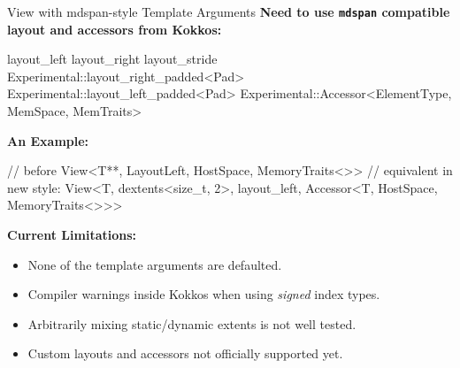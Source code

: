 \begin{frame}[fragile]{View with mdspan-style Template Arguments}
\textbf{Need to use \texttt{mdspan} compatible layout and accessors from Kokkos:}
\begin{code}[keywords={layout_left, layout_right, layout_stride, layout_left_padded, layout_right_padded, Accessor}]
   layout_left layout_right layout_stride
   Experimental::layout_right_padded<Pad> Experimental::layout_left_padded<Pad>
   Experimental::Accessor<ElementType, MemSpace, MemTraits>
\end{code}

\textbf{An Example:}
\begin{code}
  // before
  View<T**, LayoutLeft, HostSpace, MemoryTraits<>>
  // equivalent in new style:
  View<T, dextents<size_t, 2>, layout_left, Accessor<T, HostSpace, MemoryTraits<>>>
\end{code}

\textbf{Current Limitations:}
\begin{itemize}
  \item None of the template arguments are defaulted.
  \item Compiler warnings inside Kokkos when using \textit{signed} index types.
  \item Arbitrarily mixing static/dynamic extents is not well tested.
  \item Custom layouts and accessors not officially supported yet.
\end{itemize}
\end{frame}

